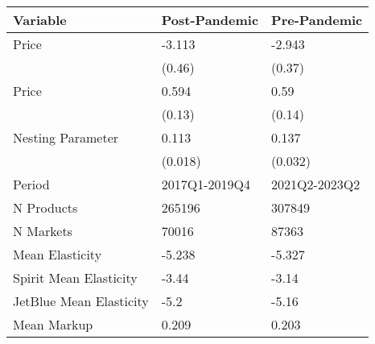 
\begin{tabular}[t]{lll}
\toprule
Variable & Post-Pandemic & Pre-Pandemic\\
\midrule
Price & -3.113 & -2.943\\
 & (0.46) & (0.37)\\
\midrule
Price & 0.594 & 0.59\\
 & (0.13) & (0.14)\\
\midrule
Nesting Parameter & 0.113 & 0.137\\
\addlinespace
 & (0.018) & (0.032)\\
\midrule
Period & 2017Q1-2019Q4 & 2021Q2-2023Q2\\
N Products & 265196 & 307849\\
N Markets & 70016 & 87363\\
Mean Elasticity & -5.238 & -5.327\\
\addlinespace
Spirit Mean Elasticity & -3.44 & -3.14\\
JetBlue Mean Elasticity & -5.2 & -5.16\\
Mean Markup & 0.209 & 0.203\\
\bottomrule
\end{tabular}

